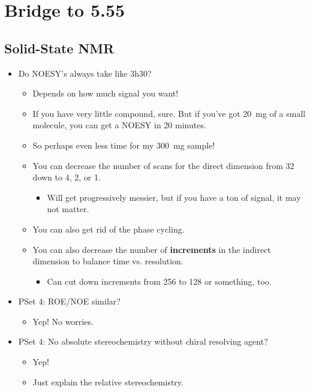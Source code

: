 \documentclass[../notes.tex]{subfiles}
\begin{document}
\chapter{Bridge to 5.55}
\section{Solid-State NMR}
\begin{itemize}
    \item {}Do NOESY's always take like 3h30?
    \begin{itemize}
        \item Depends on how much signal you want!
        \item If you have very little compound, sure. But if you've got \SI{20}{\milli\gram} of a small molecule, you can get a NOESY in 20 minutes.
        \item So perhaps even less time for my \SI{300}{\milli\gram} sample!
        \item You can decrease the number of scans for the direct dimension from 32 down to 4, 2, or 1.
        \begin{itemize}
            \item Will get progressively messier, but if you have a ton of signal, it may not matter.
        \end{itemize}
        \item You can also get rid of the phase cycling.
        \item You can also decrease the number of \textbf{increments} in the indirect dimension to balance time vs. resolution.
        \begin{itemize}
            \item Can cut down increments from 256 to 128 or something, too.
        \end{itemize}
    \end{itemize}
    \item PSet 4: ROE/NOE similar?
    \begin{itemize}
        \item Yep! No worries.
    \end{itemize}
    \item PSet 4: No absolute stereochemistry without chiral resolving agent?
    \begin{itemize}
        \item Yep!
        \item Just explain the relative stereochemistry.
    \end{itemize}

\end{itemize}
\end{document}
